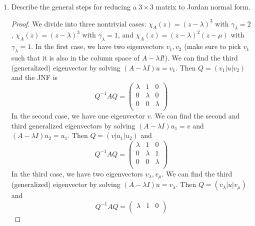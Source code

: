 \documentclass[../psets.tex]{subfiles}
\begin{document}
\begin{enumerate}
\begin{proof}
\begin{align*}
\begin{pmatrix}
                -1 & 1\\
                0 & -1\\
            \end{pmatrix}
        \end{align*}
    \end{proof}
    \item Describe the general steps for reducing a $3\times 3$ matrix to Jordan normal form.
    \begin{proof}
        We divide into three nontrivial cases: $\chi_A(z)=(z-\lambda)^3$ with $\gamma_\lambda=2$, $\chi_A(z)=(z-\lambda)^3$ with $\gamma_\lambda=1$, and $\chi_A(z)=(z-\lambda)^2(z-\mu)$ with $\gamma_\lambda=1$.
        In the first case, we have two eigenvectors $v_1,v_2$ (make sure to pick $v_1$ such that it is also in the column space of $A-\lambda I$!). We can find the third (generalized) eigenvector by solving $(A-\lambda I)u=v_1$. Then $Q=(v_1|u|v_2)$ and the JNF is
        \begin{equation*}
            Q^{-1}AQ =
            \begin{pmatrix}
                \lambda & 1 & 0\\
                0 & \lambda & 0\\
                0 & 0 & \lambda\\
            \end{pmatrix}
        \end{equation*}
        In the second case, we have one eigenvector $v$. We can find the second and third generalized eigenvectors by solving $(A-\lambda I)u_1=v$ and $(A-\lambda I)u_2=u_1$. Then $Q=(v|u_1|u_2)$ and
        \begin{equation*}
            Q^{-1}AQ =
            \begin{pmatrix}
                \lambda & 1 & 0\\
                0 & \lambda & 1\\
                0 & 0 & \lambda\\
            \end{pmatrix}
        \end{equation*}
        In the third case, we have two eigenvectors $v_\lambda,v_\mu$. We can find the third (generalized) eigenvector by solving $(A-\lambda I)u=v_\lambda$. Then $Q=(v_\lambda|u|v_\mu)$ and
        \begin{equation*}
            Q^{-1}AQ =
            \begin{pmatrix}
                \lambda & 1 & 0\\

\end{pmatrix}
\end{equation*}
\end{proof}
\end{enumerate}
\end{document}
